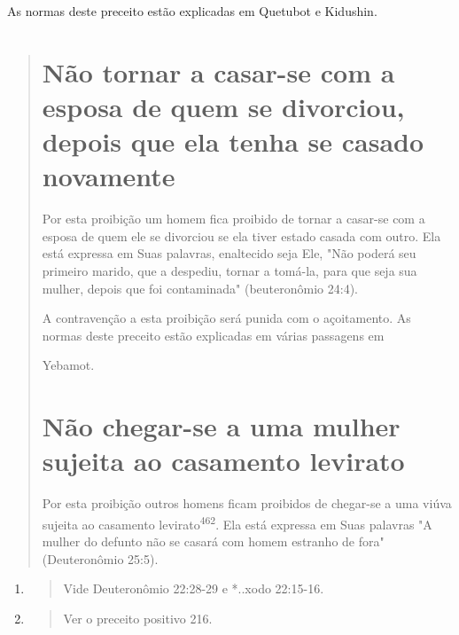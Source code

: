 As normas deste preceito estão explicadas em Quetubot e Kidushin.

\begin{quote}
\section{Não tornar a casar-se com a esposa de quem se divorciou,
depois que ela tenha se casado novamente}

Por esta proibição um homem fica proibido de tornar a casar-se com a
esposa de quem ele se divorciou se ela tiver estado casada com outro.
Ela está expressa em Suas palavras, enaltecido seja Ele, "Não poderá seu
primeiro marido, que a despediu, tornar a tomá-la, para que seja sua
mulher, depois que foi contaminada" (beuteronômio 24:4).

A contravenção a esta proibição será punida com o açoitamento. As normas
deste preceito estão explicadas em várias passagens em

Yebamot.

\section{Não chegar-se a uma mulher sujeita ao casamento levirato}

Por esta proibição outros homens ficam proibidos de chegar-se a uma
viúva sujeita ao casamento levirato\textsuperscript{462}. Ela está
expressa em Suas palavras "A mulher do defunto não se casará com homem
estranho de fora" (Deuteronô­mio 25:5).
\end{quote}

\begin{enumerate}
\def\labelenumi{\arabic{enumi}.}
\setcounter{enumi}{460}
\item
 \begin{quote}
 Vide Deuteronômio 22:28-29 e *..xodo 22:15-16.
 \end{quote}
\item
 \begin{quote}
 Ver o preceito positivo 216.
 \end{quote}
\end{enumerate}

